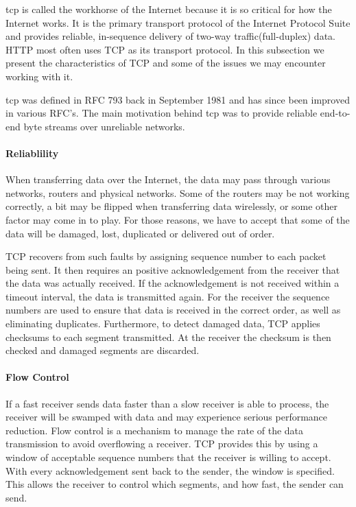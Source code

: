 \gls{tcp} is called the workhorse of the Internet because it is so critical for
how the Internet works. It is the primary transport protocol of the Internet
Protocol Suite\cite{rfc-1122} and provides reliable, in-sequence delivery of
two-way traffic(full-duplex) data. HTTP most often uses TCP as its transport
protocol. In this subsection we present the characteristics of TCP and some of
the issues we may encounter working with it.

\gls{tcp} was defined in RFC 793\cite{rfc-793} back in September 1981 and has
since been improved in various RFC's. The main motivation behind \gls{tcp} was
to provide reliable end-to-end byte streams over unreliable networks.

\paragraph{Reliablility}

When transferring data over the Internet, the data may pass through various
networks, routers and physical networks. Some of the routers may be not working
correctly, a bit may be flipped when transferring data wirelessly, or some other
factor may come in to play. For those reasons, we have to accept that some of
the data will be damaged, lost, duplicated or delivered out of order.

TCP recovers from such faults by assigning sequence number to each packet being
sent. It then requires an positive acknowledgement from the receiver that the
data was actually received. If the acknowledgement is not received within a
timeout interval, the data is transmitted again. For the receiver the sequence
numbers are used to ensure that data is received in the correct order, as well
as eliminating duplicates. Furthermore, to detect damaged data, TCP applies
checksums to each segment transmitted. At the receiver the checksum is then
checked and damaged segments are discarded.

\paragraph{Flow Control}

If a fast receiver sends data faster than a slow receiver is able to process,
the receiver will be swamped with data and may experience serious performance
reduction. Flow control is a mechanism to manage the rate of the data
transmission to avoid overflowing a receiver. TCP provides this by using a
window of acceptable sequence numbers that the receiver is willing to accept.
With every acknowledgement sent back to the sender, the window is specified.
This allows the receiver to control which segments, and how fast, the sender
can send.

